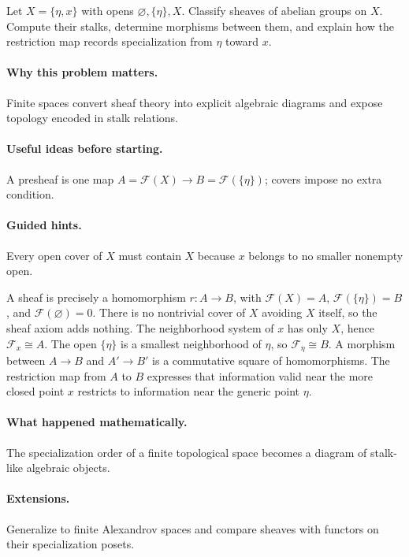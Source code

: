 \begin{problem}
Let $X=\{\eta,x\}$ with opens $\varnothing,\{\eta\},X$. Classify sheaves of abelian groups on $X$. Compute their stalks, determine morphisms between them, and explain how the restriction map records specialization from $\eta$ toward $x$.
\end{problem}

\paragraph{Why this problem matters.}
Finite spaces convert sheaf theory into explicit algebraic diagrams and expose topology encoded in stalk relations.

\paragraph{Useful ideas before starting.}
A presheaf is one map $A=\mathcal F(X)\to B=\mathcal F(\{\eta\})$; covers impose no extra condition.

\paragraph{Guided hints.}
Every open cover of $X$ must contain $X$ because $x$ belongs to no smaller nonempty open.

\ifdefined\FullProblemDossiers
\begin{solution}
A sheaf is precisely a homomorphism $r:A\to B$, with $\mathcal F(X)=A$, $\mathcal F(\{\eta\})=B$, and $\mathcal F(\varnothing)=0$. There is no nontrivial cover of $X$ avoiding $X$ itself, so the sheaf axiom adds nothing. The neighborhood system of $x$ has only $X$, hence $\mathcal F_x\cong A$. The open $\{\eta\}$ is a smallest neighborhood of $\eta$, so $\mathcal F_\eta\cong B$. A morphism between $A\to B$ and $A'\to B'$ is a commutative square of homomorphisms. The restriction map from $A$ to $B$ expresses that information valid near the more closed point $x$ restricts to information near the generic point $\eta$.
\end{solution}

\paragraph{What happened mathematically.}
The specialization order of a finite topological space becomes a diagram of stalk-like algebraic objects.

\paragraph{Extensions.}
Generalize to finite Alexandrov spaces and compare sheaves with functors on their specialization posets.
\fi
